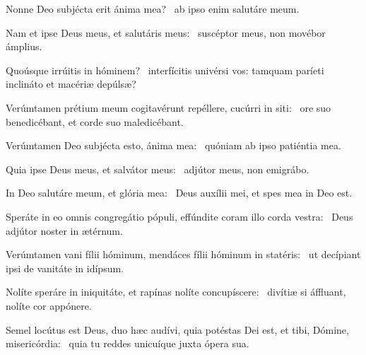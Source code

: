 \item Nonne Deo subjécta erit ánima mea?~\psstar{} ab ipso enim salutáre meum.

\item Nam et ipse Deus meus, et salutáris meus:~\psstar{} suscéptor meus, non movébor ámplius.

\item Quoúsque irrúitis in hóminem?~\psstar{} interfícitis univérsi vos: tamquam paríeti inclináto et macériæ depúlsæ?

\item Verúmtamen prétium meum cogitavérunt repéllere, cucúrri in siti:~\psstar{} ore suo benedicébant, et corde suo maledicébant.

\item Verúmtamen Deo subjécta esto, ánima mea:~\psstar{} quóniam ab ipso patiéntia mea.

\item Quia ipse Deus meus, et salvátor meus:~\psstar{} adjútor meus, non emigrábo.

\item In Deo salutáre meum, et glória mea:~\psstar{} Deus auxílii mei, et spes mea in Deo est.

\item Speráte in eo omnis congregátio pópuli, effúndite coram illo corda vestra:~\psstar{} Deus adjútor noster in ætérnum.

\item Verúmtamen vani fílii hóminum, mendáces fílii hóminum in statéris:~\psstar{} ut decípiant ipsi de vanitáte in idípsum.

\item Nolíte speráre in iniquitáte, et rapínas nolíte concupíscere:~\psstar{} divítiæ si áffluant, nolíte cor appónere.

\item Semel locútus est Deus, duo hæc audívi, quia potéstas Dei est, et tibi, Dómine, misericórdia:~\psstar{} quia tu reddes unicuíque juxta ópera sua.